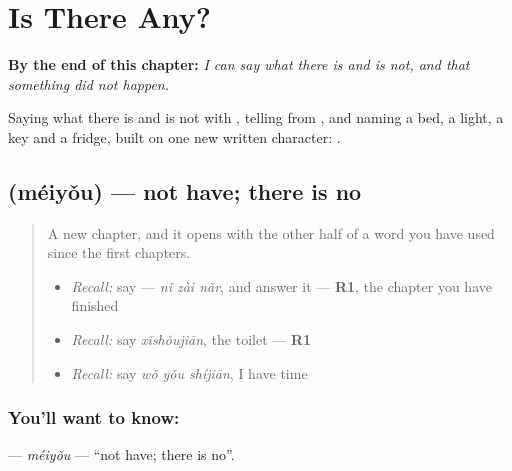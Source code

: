 
\chapter{Is There Any?}
\label{ch:zh-is-there-any}

\begin{chapteropening}
\textbf{By the end of this chapter:} \emph{I can say what there is and is not, and that something did not happen.}

Saying what there is and is not with , telling  from , and naming a bed, a light, a key and a fridge, built on one new written character: .
\end{chapteropening}

\section[\texorpdfstring{\zh{没有} (méiyǒu)}{没有 (méiyǒu)}]{ (méiyǒu) — not have; there is no}

\label{lesson:ZH-C87-meiyou}



\begin{quote}
A new chapter, and it opens with the other half of a word you have used since the first chapters.

\begin{itemize}
\raggedright
  \item \emph{Recall:} say  — \emph{nǐ zài nǎr}, and answer it — \textbf{R1}, the chapter you have finished
  \item \emph{Recall:} say \emph{xǐshǒujiān}, the toilet — \textbf{R1}
  \item \emph{Recall:} say \emph{wǒ yǒu shíjiān}, I have time
\end{itemize}
\end{quote}

\subsection*{You'll want to know: }
\textbf{} — \emph{méiyǒu} — \textquotedblleft{}not have; there is no\textquotedblright{}.

